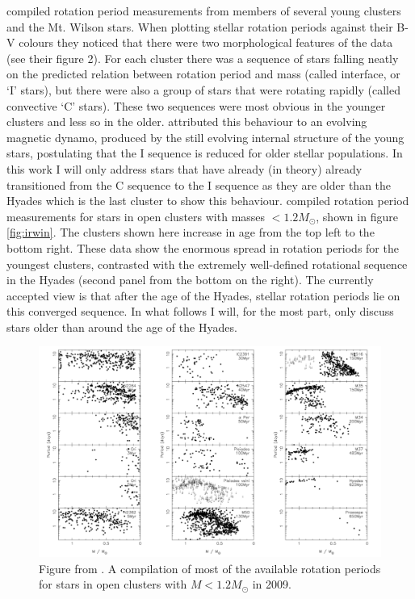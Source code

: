 \citet{Barnes2003} compiled rotation period measurements from members of
several young clusters and the Mt. Wilson stars.
When plotting stellar rotation periods against their B-V colours they noticed
that there were two morphological features of the data (see their figure 2).
For each cluster there was a sequence of stars falling neatly on the predicted
relation between rotation period and mass (called interface, or `I' stars),
but there were also a group of stars that were rotating rapidly (called
convective `C' stars).
These two sequences were most obvious in the younger clusters and less so in
the older.
\citet{Barnes2003} attributed this behaviour to an evolving magnetic dynamo,
produced by the still evolving internal structure of the young stars,
postulating that the I sequence is reduced for older stellar populations.
In this work I will only address stars that have already (in theory) already
transitioned from the C sequence to the I sequence as they are older than the
Hyades which is the last cluster to show this behaviour.
\citet{Irwin2009} compiled rotation period measurements for stars in open
clusters with masses $< 1.2 M_\odot$, shown in figure \ref{fig:irwin}.
The clusters shown here increase in age from the top left to the bottom right.
These data show the enormous spread in rotation periods for the youngest
clusters, contrasted with the extremely well-defined rotational sequence in
the Hyades (second panel from the bottom on the right).
The currently accepted view is that after the age of the Hyades, stellar
rotation periods lie on this converged sequence.
In what follows I will, for the most part, only discuss stars older than
around the age of the Hyades.

\begin{figure}[p]
\begin{center}
\includegraphics[width=6in, clip=true]{figures/irwin.pdf}
\caption{Figure from \citet{Irwin2009}. A compilation of most of the available
rotation periods for stars in open clusters with $M < 1.2 M_\odot$ in
2009.}
\label{fig:solar_spectrum}
\end{center}
\end{figure}

